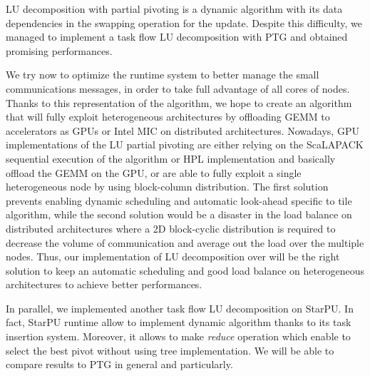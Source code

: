 LU decomposition with partial pivoting is a dynamic algorithm with its data dependencies in the swapping operation for the update. Despite this difficulty, we managed to implement a task flow LU decomposition with PTG and obtained promising performances.

We try now to optimize the \dague runtime system to better manage the small communications messages, in order to take full advantage of all cores of nodes. 
Thanks to this representation of the algorithm, we hope to create an algorithm that will fully exploit heterogeneous architectures by offloading GEMM to accelerators as GPUs or Intel MIC on distributed architectures. Nowadays, GPU implementations of the LU partial pivoting are either relying on the ScaLAPACK sequential execution of the algorithm or HPL implementation and basically offload the GEMM on the GPU, or are able to fully exploit a single heterogeneous node by using block-column distribution. The first solution prevents enabling dynamic scheduling and automatic look-ahead specific to tile algorithm, while the second solution would be a disaster in the load balance on distributed architectures where a 2D block-cyclic distribution is required to decrease the volume of communication and average out the load over the multiple nodes. Thus, our implementation of LU decomposition over \dague will be the right solution to keep an automatic scheduling and good load balance on heterogeneous architectures to achieve better performances.

In parallel, we implemented another task flow LU decomposition on StarPU. In fact, StarPU runtime allow to implement dynamic algorithm  thanks to its task insertion system. Moreover, it allows to make \emph{reduce} operation which enable to select the best pivot without using tree implementation. We will be able to compare results to PTG in general and \dague particularly.